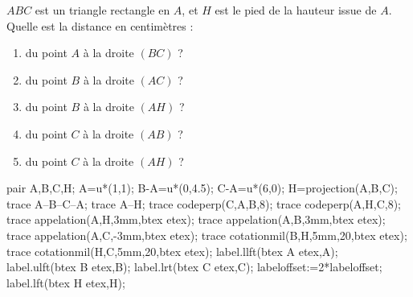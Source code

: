 \begin{exercice*}
   $ABC$ est un triangle rectangle en $A$, et $H$ est le pied de la hauteur issue de $A$. Quelle est la distance en centimètres :
   \begin{enumerate}
      \item du point $A$ à la droite $(BC)$ ?
      \item du point $B$ à la droite $(AC)$ ?
      \item du point $B$ à la droite $(AH)$ ?
      \item du point $C$ à la droite $(AB)$ ?
      \item du point $C$ à la droite $(AH)$ ?
   \end{enumerate}
   \begin{center}
      \begin{Geometrie}
         pair A,B,C,H;
         A=u*(1,1);
         B-A=u*(0,4.5);
         C-A=u*(6,0);
         H=projection(A,B,C);
         trace A--B--C--A;
         trace A--H;
         trace codeperp(C,A,B,8);
         trace codeperp(A,H,C,8);
         trace appelation(A,H,3mm,btex  etex);
         trace appelation(A,B,3mm,btex  etex);
         trace appelation(A,C,-3mm,btex  etex);
         trace cotationmil(B,H,5mm,20,btex  etex);
         trace cotationmil(H,C,5mm,20,btex  etex);
         label.llft(btex A etex,A);
         label.ulft(btex B etex,B);
         label.lrt(btex C etex,C);
         labeloffset:=2*labeloffset;
         label.lft(btex H etex,H);
      \end{Geometrie}
   \end{center}
\end{exercice*}
 